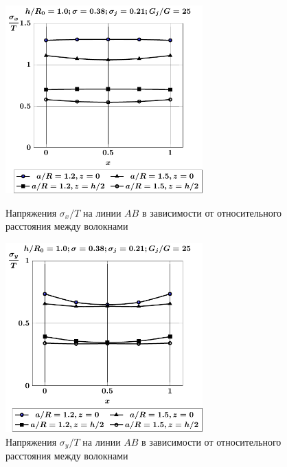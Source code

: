 \begin{figure}[h!]
\centering\footnotesize
\parbox[b]{7.5cm}{\centering\includegraphics[width=7.6cm]{inc6-a-sig_x.pdf}
\caption{Напряжения $\sigma_x/T$ на линии $AB$ в зависимости от относительного расстояния между волокнами
\label{f:7:77}}}\hfil\hfil
\parbox[b]{7.5cm}{\centering\includegraphics[width=7.6cm]{inc6-a-sig_y.pdf}
\caption{Напряжения $\sigma_y/T$ на линии $AB$ в зависимости от относительного расстояния между волокнами
\label{f:7:78}}}
\end{figure}

%

